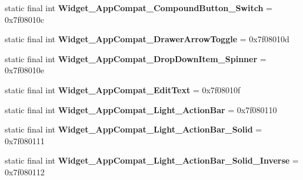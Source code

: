 \begin{DoxyCompactItemize}
\item 
\hypertarget{classandroid_1_1support_1_1v7_1_1appcompat_1_1_r_1_1style_a9edca8cda8d4a4ec1a52c2e61195d1cd}{}static final int {\bfseries Widget\+\_\+\+App\+Compat\+\_\+\+Compound\+Button\+\_\+\+Switch} = 0x7f08010c\label{classandroid_1_1support_1_1v7_1_1appcompat_1_1_r_1_1style_a9edca8cda8d4a4ec1a52c2e61195d1cd}

\item 
\hypertarget{classandroid_1_1support_1_1v7_1_1appcompat_1_1_r_1_1style_a3414cd0dee8049b32bc8ffaf55ed8808}{}static final int {\bfseries Widget\+\_\+\+App\+Compat\+\_\+\+Drawer\+Arrow\+Toggle} = 0x7f08010d\label{classandroid_1_1support_1_1v7_1_1appcompat_1_1_r_1_1style_a3414cd0dee8049b32bc8ffaf55ed8808}

\item 
\hypertarget{classandroid_1_1support_1_1v7_1_1appcompat_1_1_r_1_1style_ac00c6268b87ac497649f5ad831be1f99}{}static final int {\bfseries Widget\+\_\+\+App\+Compat\+\_\+\+Drop\+Down\+Item\+\_\+\+Spinner} = 0x7f08010e\label{classandroid_1_1support_1_1v7_1_1appcompat_1_1_r_1_1style_ac00c6268b87ac497649f5ad831be1f99}

\item 
\hypertarget{classandroid_1_1support_1_1v7_1_1appcompat_1_1_r_1_1style_a144c07042a4fb9247342c0f30f15e367}{}static final int {\bfseries Widget\+\_\+\+App\+Compat\+\_\+\+Edit\+Text} = 0x7f08010f\label{classandroid_1_1support_1_1v7_1_1appcompat_1_1_r_1_1style_a144c07042a4fb9247342c0f30f15e367}

\item 
\hypertarget{classandroid_1_1support_1_1v7_1_1appcompat_1_1_r_1_1style_a0dbaf9e73449b6162f7b937d60dcc7f6}{}static final int {\bfseries Widget\+\_\+\+App\+Compat\+\_\+\+Light\+\_\+\+Action\+Bar} = 0x7f080110\label{classandroid_1_1support_1_1v7_1_1appcompat_1_1_r_1_1style_a0dbaf9e73449b6162f7b937d60dcc7f6}

\item 
\hypertarget{classandroid_1_1support_1_1v7_1_1appcompat_1_1_r_1_1style_a8749b52940b38a7fcb284f2cb459a72b}{}static final int {\bfseries Widget\+\_\+\+App\+Compat\+\_\+\+Light\+\_\+\+Action\+Bar\+\_\+\+Solid} = 0x7f080111\label{classandroid_1_1support_1_1v7_1_1appcompat_1_1_r_1_1style_a8749b52940b38a7fcb284f2cb459a72b}

\item 
\hypertarget{classandroid_1_1support_1_1v7_1_1appcompat_1_1_r_1_1style_ab3afe165048e9644abccc3269d0298ae}{}static final int {\bfseries Widget\+\_\+\+App\+Compat\+\_\+\+Light\+\_\+\+Action\+Bar\+\_\+\+Solid\+\_\+\+Inverse} = 0x7f080112\label{classandroid_1_1support_1_1v7_1_1appcompat_1_1_r_1_1style_ab3afe165048e9644abccc3269d0298ae}


\end{DoxyCompactItemize}

